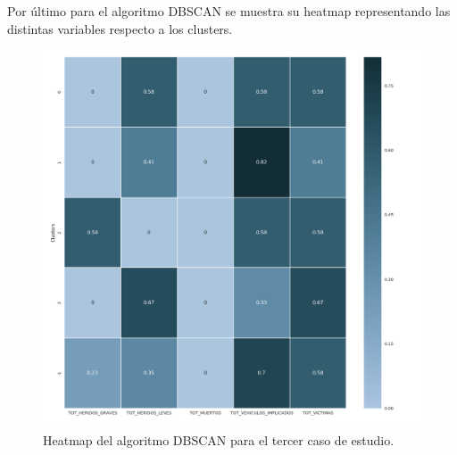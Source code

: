 	\begin{table}[H]
		\centering
		\caption{Tabla de valores medios del algoritmo DBSCAN para el tercer caso de estudio.}
	\end{table}

	Por último para el algoritmo DBSCAN se muestra su heatmap representando las distintas variables respecto a los clusters.
	
	\begin{figure}[H]
		\centering
		\includegraphics[scale=0.4]{heatmaps/DBSCAN-WetOverturnedAccidents-Heatmap.png}
		\caption{Heatmap del algoritmo DBSCAN para el tercer caso de estudio.}
	\end{figure}

